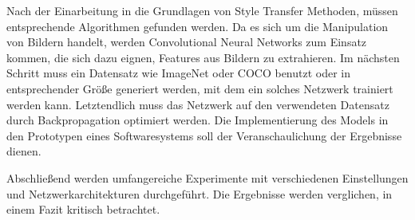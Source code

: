 Nach der Einarbeitung in die Grundlagen von Style Transfer \cite{DBLP:journals/corr/GatysEB15a, DBLP:journals/corr/JohnsonAL16} Methoden, müssen entsprechende Algorithmen gefunden werden. Da es sich um die Manipulation von Bildern handelt, werden Convolutional Neural Networks \cite{lecun-gradientbased-learning-applied-1998} zum Einsatz kommen, die sich dazu eignen, Features aus Bildern zu extrahieren. Im nächsten Schritt muss ein Datensatz wie ImageNet \cite{5206848} oder COCO \cite{DBLP:journals/corr/LinMBHPRDZ14} benutzt oder in entsprechender Größe generiert werden, mit dem ein solches Netzwerk trainiert werden kann. Letztendlich muss das Netzwerk auf den verwendeten Datensatz durch Backpropagation \cite{doi:10.1162/neco.1989.1.4.541} optimiert werden. Die Implementierung des Models in den Prototypen eines Softwaresystems soll der Veranschaulichung der Ergebnisse dienen.

Abschließend werden umfangereiche Experimente mit verschiedenen Einstellungen und Netzwerkarchitekturen durchgeführt.
Die Ergebnisse werden verglichen, in einem Fazit kritisch betrachtet.